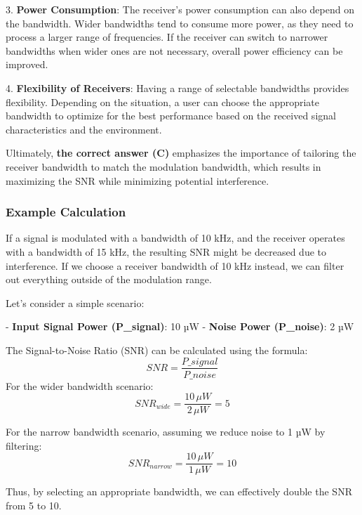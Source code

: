3. \textbf{Power Consumption}: The receiver’s power consumption can also depend on the bandwidth. Wider bandwidths tend to consume more power, as they need to process a larger range of frequencies. If the receiver can switch to narrower bandwidths when wider ones are not necessary, overall power efficiency can be improved.

4. \textbf{Flexibility of Receivers}: Having a range of selectable bandwidths provides flexibility. Depending on the situation, a user can choose the appropriate bandwidth to optimize for the best performance based on the received signal characteristics and the environment.

Ultimately, \textbf{the correct answer (C)} emphasizes the importance of tailoring the receiver bandwidth to match the modulation bandwidth, which results in maximizing the SNR while minimizing potential interference.

\subsubsection*{Example Calculation}

If a signal is modulated with a bandwidth of 10 kHz, and the receiver operates with a bandwidth of 15 kHz, the resulting SNR might be decreased due to interference. If we choose a receiver bandwidth of 10 kHz instead, we can filter out everything outside of the modulation range.

Let's consider a simple scenario:

- \textbf{Input Signal Power (P\_signal)}: 10 µW
- \textbf{Noise Power (P\_noise)}: 2 µW

The Signal-to-Noise Ratio (SNR) can be calculated using the formula:
\[
SNR = \frac{P\_signal}{P\_noise}
\]
For the wider bandwidth scenario:
\[
SNR_{wide} = \frac{10 \, \mu W}{2 \, \mu W} = 5
\]

For the narrow bandwidth scenario, assuming we reduce noise to 1 µW by filtering:
\[
SNR_{narrow} = \frac{10 \, \mu W}{1 \, \mu W} = 10
\]

Thus, by selecting an appropriate bandwidth, we can effectively double the SNR from 5 to 10.



